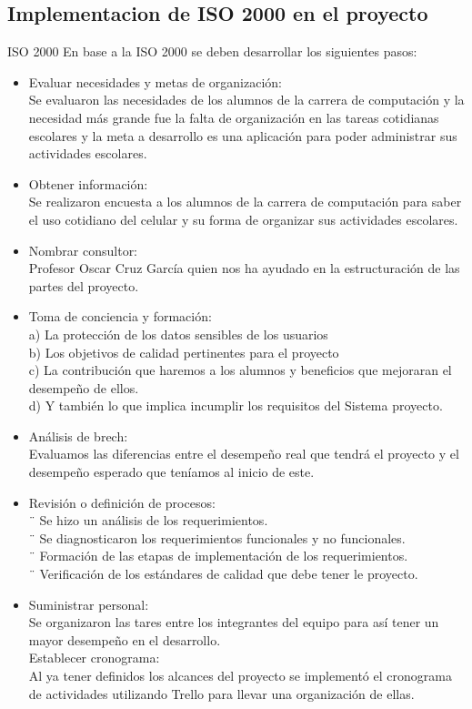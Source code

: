\documentclass[10pt]{article}
\begin{document}
\subsection{Implementacion de ISO 2000 en el proyecto}
\justify
ISO 2000
En base a la ISO 2000 se deben desarrollar los siguientes pasos:\\
\begin{itemize}
\item Evaluar necesidades y metas de organización:\\
Se evaluaron las necesidades de los alumnos de la carrera de computación y la necesidad más grande fue la falta de organización en las tareas cotidianas escolares y la meta a desarrollo es una aplicación para poder administrar sus actividades escolares.
\item Obtener información:\\
Se realizaron encuesta a los alumnos de la carrera de computación para saber el uso cotidiano del celular y su forma de organizar sus actividades escolares.
\item Nombrar consultor:\\
Profesor Oscar Cruz García quien nos ha ayudado en la estructuración de las partes del proyecto.
\item Toma de conciencia y formación:\\
a) La protección de los datos sensibles de los usuarios\\
b) Los objetivos de calidad pertinentes para el proyecto\\
c) La contribución que haremos a los alumnos y beneficios que mejoraran el desempeño de ellos.\\
d) Y también lo que implica incumplir los requisitos del Sistema proyecto.
\item Análisis de brech:\\
Evaluamos las diferencias entre el desempeño real que tendrá el proyecto y el desempeño esperado que teníamos al inicio de este.
\item Revisión o definición de procesos:\\
¨ Se hizo un análisis de los requerimientos.\\
¨ Se diagnosticaron los requerimientos funcionales y no funcionales.\\
¨ Formación de las etapas de implementación de los requerimientos.\\
¨ Verificación de los estándares de calidad que debe tener le proyecto.
\item Suministrar personal:\\
Se organizaron las tares entre los integrantes del equipo para así tener un mayor desempeño en el desarrollo.\\
Establecer cronograma:\\
Al ya tener definidos los alcances del proyecto se implementó el cronograma de actividades utilizando Trello para llevar una organización de ellas.
\end{itemize}
\end{document}
